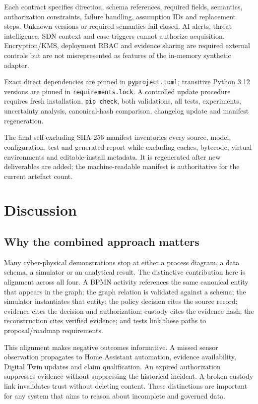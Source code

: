 ﻿\documentclass[11pt,a4paper]{article}
\newcommand{\code}[1]{\texttt{#1}}
\begin{document}
Each contract specifies direction, schema references, required fields, semantics, authorization constraints, failure handling, assumption IDs and replacement steps. Unknown versions or required semantics fail closed. AI alerts, threat intelligence, SDN context and case triggers cannot authorize acquisition. Encryption/KMS, deployment RBAC and evidence sharing are required external controls but are not misrepresented as features of the in-memory synthetic adapter.

Exact direct dependencies are pinned in \code{pyproject.toml}; transitive Python 3.12 versions are pinned in \code{requirements.lock}. A controlled update procedure requires fresh installation, \code{pip check}, both validations, all tests, experiments, uncertainty analysis, canonical-hash comparison, changelog update and manifest regeneration.

The final self-excluding SHA-256 manifest inventories every source, model, configuration, test and generated report while excluding caches, bytecode, virtual environments and editable-install metadata. It is regenerated after new deliverables are added; the machine-readable manifest is authoritative for the current artefact count.

\section{Discussion}

\subsection{Why the combined approach matters}

Many cyber-physical demonstrations stop at either a process diagram, a data schema, a simulator or an analytical result. The distinctive contribution here is alignment across all four. A BPMN activity references the same canonical entity that appears in the graph; the graph relation is validated against a schema; the simulator instantiates that entity; the policy decision cites the source record; evidence cites the decision and authorization; custody cites the evidence hash; the reconstruction cites verified evidence; and tests link these paths to proposal/roadmap requirements.

This alignment makes negative outcomes informative. A missed sensor observation propagates to Home Assistant automation, evidence availability, Digital Twin updates and claim qualification. An expired authorization suppresses evidence without suppressing the historical incident. A broken custody link invalidates trust without deleting content. These distinctions are important for any system that aims to reason about incomplete and governed data.
\end{document}
